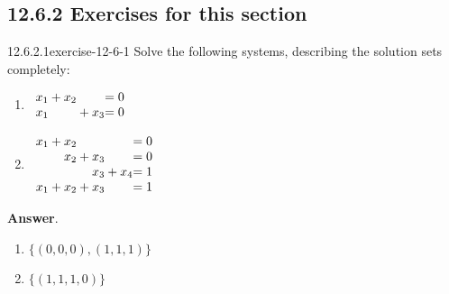 \documentclass[twoside,10pt,]{book}
\numberwithin{equation}{section}
\begin{document}
\subsection*{12.6.2 Exercises for this section}
\begin{divisionsolution}{12.6.2.1}{}{exercise-12-6-1}%
\hypertarget{p-4734}{}%
Solve the following systems, describing the solution sets completely:\leavevmode%
\begin{multicols}{2}
\begin{enumerate}[label=(\alph*)]
\item\hypertarget{li-2155}{}\hypertarget{p-4735}{}%
\(\begin{array}{r@{}r@{}r@{}r@{}r@{}r@{}}
x_1  & {}+{} & x_2 &       &     & = 0 \\
x_1  &       &     & {}+{} & x_3 & = 0 \\
\end{array} \)%
\item\hypertarget{li-2156}{}\hypertarget{p-4736}{}%
\(\begin{array}{r@{}r@{}r@{}r@{}r@{}r@{}r@{}r@{}}
x_1  & {}+{} & x_2 &       &    &       &        & = 0 \\
&       & x_2 & {}+{} & x_3&       &       &   = 0\\
&       &     &       & x_3& {}+{} & x_4   & = 1 \\
x_1  & {}+{} & x_2 & {}+{} & x_3&       &        &  = 1 \\
\end{array} \)%
\end{enumerate}
\end{multicols}
%
\par\smallskip%
\noindent\textbf{Answer}.\quad%
\hypertarget{p-4737}{}%
\leavevmode%
\begin{enumerate}[label=(\alph*)]
\item\hypertarget{li-2157}{}\hypertarget{p-4738}{}%
\(\{(0,0,0),(1,1,1)\}\)%
\item\hypertarget{li-2158}{}\hypertarget{p-4739}{}%
\(\{(1,1,1,0)\}\)%
\end{enumerate}
%
\end{divisionsolution}%
\end{document}

